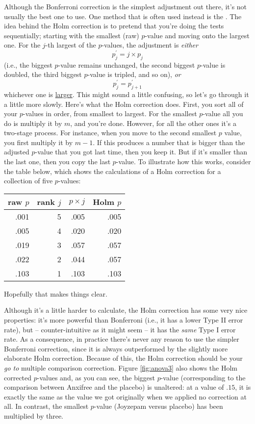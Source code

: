 Although the Bonferroni correction is the simplest adjustment out there, it's not usually the best one to use. One method that is often used instead is the  \cite{Holm1979}. The idea behind the Holm correction is to pretend that you're doing the tests sequentially; starting with the smallest (raw) $p$-value and moving onto the largest one. For the $j$-th largest of the $p$-values, the adjustment is {\it either}
$$
p^\prime_j = j \times p_j 
$$
(i.e., the biggest $p$-value remains unchanged, the second biggest $p$-value is doubled, the third biggest $p$-value is tripled, and so on), {\it or}
$$
p^\prime_j = p^\prime_{j+1}
$$
whichever one is \underline{larger}. This might sound a little confusing, so let's go through it a little more slowly. Here's what the Holm correction does. First, you sort all of your $p$-values in order, from smallest to largest. For the smallest $p$-value all you do is multiply it by $m$, and you're done. However, for all the other ones it's a two-stage process. For instance, when you move to the second smallest $p$ value, you first multiply it by $m-1$. If this produces a number that is bigger than the adjusted $p$-value that you got last time, then you keep it. But if it's smaller than the last one, then you copy the last $p$-value. To illustrate how this works, consider the table below, which shows the calculations of a Holm correction for a collection of five $p$-values:
\begin{center}
\begin{tabular}{rrrr} 
 raw $p$ & rank $j$ & $p \times j$ & Holm $p$   \\ \hline
.001 & 5 & .005 & .005 \\
.005 & 4 & .020 & .020 \\
.019 & 3 & .057 & .057 \\
.022 & 2 & .044 & .057 \\
.103 & 1 & .103 & .103 \\
\end{tabular}
\end{center}
Hopefully that makes things clear. 

Although it's a little harder to calculate, the Holm correction has some very nice properties: it's more powerful than Bonferroni (i.e., it has a lower Type II error rate), but -- counter-intuitive as it might seem -- it has the {\it same} Type I error rate. As a consequence, in practice there's never any reason to use the simpler Bonferroni correction, since it is always outperformed by the slightly more elaborate Holm correction. Because of this, the Holm correction should be your {\it go to} multiple comparison correction. Figure \ref{fig:anova3} also shows the Holm corrected $p$-values and, as you can see, the biggest $p$-value (corresponding to the comparison between Anxifree and the placebo) is unaltered: at a value of $.15$, it is exactly the same as the value we got originally when we applied no correction at all. In contrast, the smallest $p$-value (Joyzepam versus placebo) has been multiplied by three. 



